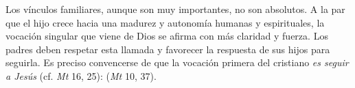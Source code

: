 	 Los vínculos familiares, aunque son muy importantes, no son absolutos. A la par que el hijo crece hacia una madurez y autonomía humanas y espirituales, la vocación singular que viene de Dios se afirma con más claridad y fuerza. Los padres deben respetar esta llamada y favorecer la respuesta de sus hijos para seguirla. Es preciso convencerse de que la vocación primera del cristiano \emph{es seguir a Jesús} (cf. \emph{Mt} 16, 25):  (\emph{Mt} 10, 37).
